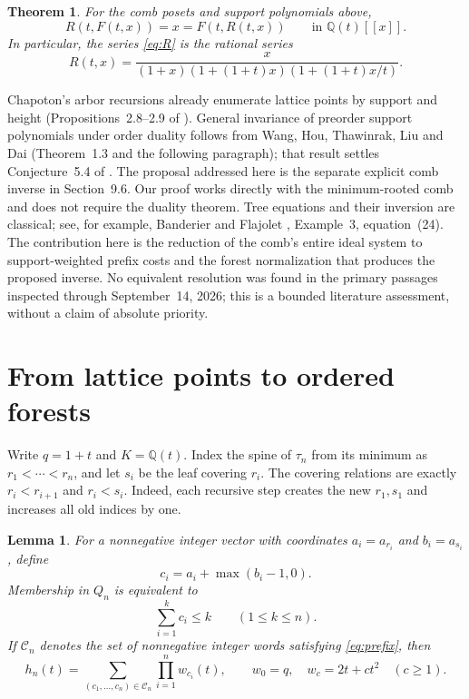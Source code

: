 \documentclass[11pt]{article}
\newtheorem{theorem}{Theorem}
\newtheorem{lemma}{Lemma}
\newcommand{\Q}{\mathbb{Q}}
\newcommand{\Cset}{\mathcal{C}}
\begin{document}
\begin{theorem}\label{thm:main}
For the comb posets and support polynomials above,
\begin{equation}\label{eq:inverse}
 R(t,F(t,x))=x=F(t,R(t,x))\qquad\text{in }\Q(t)[[x]].
\end{equation}
In particular, the series \eqref{eq:R} is the rational series
\begin{equation}\label{eq:rational}
 R(t,x)=\frac{x}{(1+x)(1+(1+t)x)(1+(1+t)x/t)}.
\end{equation}
\end{theorem}

Chapoton's arbor recursions already enumerate lattice points by support and
height (Propositions~2.8--2.9 of \cite{Chapoton}). General invariance of preorder
support polynomials under order duality follows from Wang, Hou, Thawinrak,
Liu and Dai \cite{Wang} (Theorem~1.3 and the following paragraph); that result
settles Conjecture~5.4 of \cite{AC}. The proposal addressed here is the
separate explicit comb inverse in Section~9.6. Our proof works directly
with the minimum-rooted comb and does not require the duality theorem.
Tree equations and their inversion are classical; see, for example,
Banderier and Flajolet \cite{BF}, Example~3, equation~(24).
The contribution here is the reduction of the comb's entire ideal system
to support-weighted prefix costs and the forest normalization that produces
the proposed inverse. No equivalent resolution was found in the primary
passages inspected through September~14, 2026; this is a bounded literature
assessment, without a claim of absolute priority.

\section{From lattice points to ordered forests}

Write $q=1+t$ and $K=\Q(t)$. Index the spine of $\tau_n$ from its minimum
as $r_1<\cdots<r_n$, and let $s_i$ be the leaf covering $r_i$.
The covering relations are exactly $r_i<r_{i+1}$ and $r_i<s_i$.
Indeed, each recursive step creates the new $r_1,s_1$ and increases all old
indices by one.

\begin{lemma}\label{lem:costs}
For a nonnegative integer vector with coordinates
$a_i=a_{r_i}$ and $b_i=a_{s_i}$, define
\[
 c_i=a_i+\max(b_i-1,0).
\]
Membership in $Q_n$ is equivalent to
\begin{equation}\label{eq:prefix}
 \sum_{i=1}^k c_i\leq k\qquad(1\leq k\leq n).
\end{equation}
If $\Cset_n$ denotes the set of nonnegative integer words satisfying
\eqref{eq:prefix}, then
\begin{equation}\label{eq:weighted}
 h_n(t)=\sum_{(c_1,\ldots,c_n)\in\Cset_n}\prod_{i=1}^n w_{c_i}(t),
 \qquad w_0=q,\quad w_c=2t+ct^2\quad(c\geq1).
\end{equation}
\end{lemma}
\end{document}
